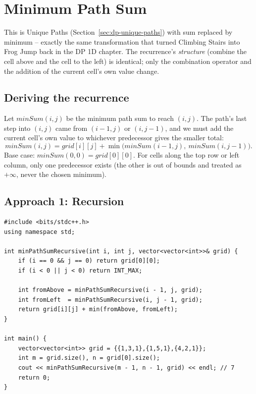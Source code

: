 \section{Minimum Path Sum}
\label{sec:dp-minimum-path-sum}


\begin{patternbox}
This is Unique Paths (Section~\ref{sec:dp-unique-paths}) with sum
replaced by minimum -- exactly the same transformation that turned
Climbing Stairs into Frog Jump back in the DP 1D chapter. The
recurrence's \emph{structure} (combine the cell above and the cell to
the left) is identical; only the combination operator and the addition
of the current cell's own value change.
\end{patternbox}

\subsection*{Deriving the recurrence}

Let $\textit{minSum}(i,j)$ be the minimum path sum to reach $(i,j)$. The
path's last step into $(i,j)$ came from $(i-1,j)$ or $(i,j-1)$, and we
must add the current cell's own value to whichever predecessor gives the
smaller total:
\[
  \textit{minSum}(i,j) = \textit{grid}[i][j] + \min\big(
  \textit{minSum}(i-1,j),\ \textit{minSum}(i,j-1)\big).
\]
Base case: $\textit{minSum}(0,0) = \textit{grid}[0][0]$. For cells along
the top row or left column, only one predecessor exists (the other is
out of bounds and treated as $+\infty$, never the chosen minimum).

\subsection*{Approach 1: Recursion}

\begin{lstlisting}
#include <bits/stdc++.h>
using namespace std;

int minPathSumRecursive(int i, int j, vector<vector<int>>& grid) {
    if (i == 0 && j == 0) return grid[0][0];
    if (i < 0 || j < 0) return INT_MAX;

    int fromAbove = minPathSumRecursive(i - 1, j, grid);
    int fromLeft  = minPathSumRecursive(i, j - 1, grid);
    return grid[i][j] + min(fromAbove, fromLeft);
}

int main() {
    vector<vector<int>> grid = {{1,3,1},{1,5,1},{4,2,1}};
    int m = grid.size(), n = grid[0].size();
    cout << minPathSumRecursive(m - 1, n - 1, grid) << endl; // 7
    return 0;
}
\end{lstlisting}

